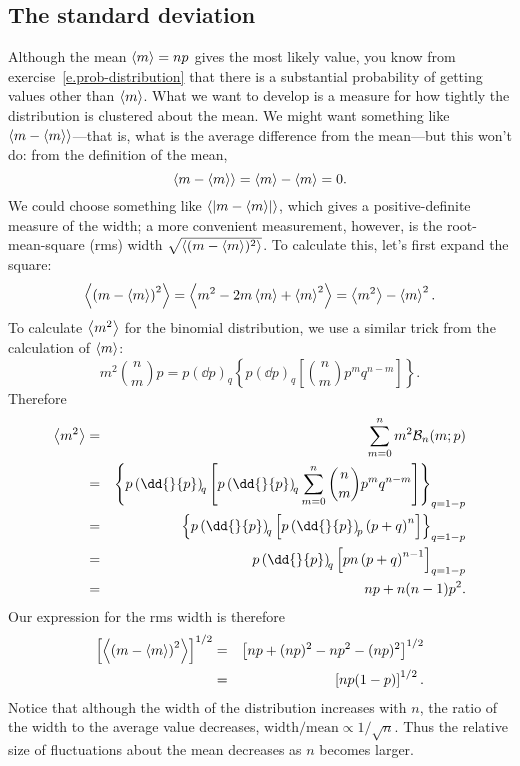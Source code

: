 \subsection{The standard deviation}
Although the mean $\left\langle m\right\rangle = np$ gives the most likely value, you know from exercise~\ref{e.prob-distribution} that there is a substantial probability of getting values other than $\left\langle m\right\rangle$. What we want to develop is a measure for how tightly the distribution is clustered about the mean.  We might want something like $\left\langle m-\left\langle m\right\rangle\right\rangle$---that is, what is the average difference from the mean---but this won't do: from the definition of the mean,
\[ \left\langle m-\left\langle m\right\rangle\right\rangle = \left\langle m\right\rangle-\left\langle m\right\rangle = 0. \]
We could choose something like $\left\langle\left|m-\left\langle m\right\rangle\right|\right\rangle$, which gives a positive-definite measure of the width; a more convenient measurement, however, is the root-mean-square (rms) width $\sqrt{\left\langle(m-\left\langle m\right\rangle)^{2}\right\rangle}$.  To calculate this, let's first expand the square:
\[
	\left\langle\left(m-\left\langle m\right\rangle\right)^{2}\right\rangle = \left\langle m^{2} - 2m\left\langle m\right\rangle + \left\langle m\right\rangle^{2}\right\rangle
		= \left\langle m^{2}\right\rangle - \left\langle m\right\rangle^{2}.
\]
To calculate $\left\langle m^{2}\right\rangle$ for the binomial distribution, we use a similar trick from the calculation of $\left\langle m\right\rangle$:
\[
	m^{2}\binom{n}{m}{p} = p\left(\dd{}{p}\right)_{\!q}\left\{ p\left(\dd{}{p}\right)_{\!q} 
	\left[{n\choose m} p^{m}q^{n-m}\right]\right\}.
\]
Therefore
\begin{eqnarray*}
	\mean{m^{2}} &=& \sum_{m=0}^{n}m^{2}\binom{n}{m}{p} \\
	&=& \left\{p\left(\dd{}{p}\right)_{\!q}\left[p\left(\dd{}{p}\right)_{\!q}\sum_{m=0}^{n}{n\choose m}p^{m}q^{n-m}\right]\right\}_{q=1-p} \\
	&=& \left\{p\left(\dd{}{p}\right)_{\!q}\left[p\left(\dd{}{p}\right)_{\!p}\left(p+q\right)^{n}\right]\right\}_{q=1-p} \\
	&=& p\left(\dd{}{p}\right)_{\!q}\left[pn\left(p+q\right)^{n-1}\right]_{q=1-p} \\
	&=& np + n(n-1)p^{2}.
\end{eqnarray*}
Our expression for the rms width is therefore
\begin{eqnarray}
	\left[\left\langle\left(m-\left\langle m\right\rangle\right)^{2}\right\rangle\right]^{1/2} &=& \left[ np + (np)^{2}-np^{2} - (np)^{2}\right]^{1/2}\nonumber\\
	 &=& \left[np(1-p)\right]^{1/2}.
\end{eqnarray}
Notice that although the width of the distribution increases with $n$, the ratio of the width to the average value decreases, $\textrm{width}/\textrm{mean} \propto 1/\sqrt{n}$.  Thus the relative size of fluctuations about the mean decreases as $n$ becomes larger.

